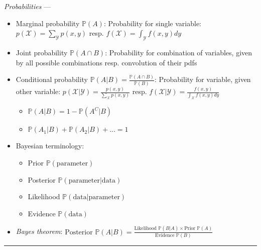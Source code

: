 \emph{Probabilities} --- 
\begin{itemize}
    \item Marginal probability $\mathbb{P}(A)$: Probability for single variable: $p(\mathcal{X}) = \sum_{\mathcal{Y}}p(x,y)$ resp. $f(\mathcal{X}) = \int_{\mathcal{Y}}f(x,y)dy$
    \item Joint probability $\mathbb{P}(A \cap B)$: Probability for combination of variables, given by all possible combinations resp. convolution of their pdfs 
    \item Conditional probability $\mathbb{P}(A|B) = \frac{\mathbb{P}(A \cap B)}{\mathbb{P}(B)}$: Probability for variable, given other variable: $p(\mathcal{X}|\mathcal{Y}) = \frac{p(x,y)}{\sum_{\mathcal{X}}p(x,y)}$ resp. $f(\mathcal{X}|\mathcal{Y}) = \frac{f(x,y)}{\int_{\mathcal{X}}f(x,y)dy}$
    \begin{itemize}
        \item $\mathbb{P}(A|B) = 1 - \mathbb{P}(A^C|B)$
        \item $\mathbb{P}(A_1|B) + \mathbb{P}(A_2|B) + ... = 1$
    \end{itemize}
    \item Bayesian terminology: 
    \begin{itemize}
        \item Prior $\mathbb{P}(\textrm{parameter})$
        \item Posterior $\mathbb{P}(\textrm{parameter} | \textrm{data})$
        \item Likelihood $\mathbb{P}(\textrm{data} | \textrm{parameter})$
        \item Evidence $\mathbb{P}(\textrm{data})$
    \end{itemize}
    \item \emph{Bayes theorem}: $\textrm{Posterior } \mathbb{P}(A|B) = \frac{\textrm{Likelihood }\mathbb{P}(B|A) \times  \textrm{Prior }\mathbb{P}(A)}{\textrm{Evidence }\mathbb{P}(B)}$
\end{itemize}

{\color{black}\hrule height 0.001mm}

